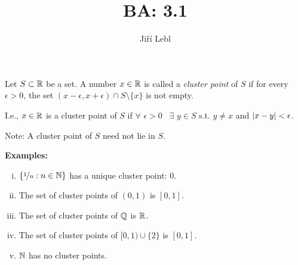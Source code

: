 \documentclass[10pt,aspectratio=169]{beamer}
\author{Ji\v{r}\'i Lebl}
\institute[OSU]{%
Departemento pri Matematiko de Oklahoma {\^S}tata Universitato}
\title{BA: 3.1}
\date{}
\begin{document}
\begin{frame}
\titlepage
\end{frame}

\begin{frame}
\begin{definition}
Let $S \subset {\mathbb{R}}$ be a set.  A number $x \in {\mathbb{R}}$ is called
a \emph{cluster point} of $S$
if for every $\epsilon > 0$, the set $(x-\epsilon,x+\epsilon) \cap S
\setminus \{ x \}$ is not empty.
\end{definition}

\pause

I.e.,
$x \in {\mathbb{R}}$ is a cluster point of $S$ if $\forall$ $\epsilon > 0$ ~$\exists$ $y \in
S$ s.t. $y \not= x$ and $\left\lvert {x - y} \right\rvert < \epsilon$.

\pause
\medskip

Note: A cluster point of $S$ need not lie in $S$.

\pause
\medskip

\textbf{Examples:}
\begin{enumerate}[(i)]
\item
$\{ \nicefrac{1}{n} : n \in {\mathbb{N}} \}$ has a unique cluster point: $0$.
\item\pause The set of cluster points of $(0,1)$ is
$[0,1]$.
\item\pause
The set of cluster points of ${\mathbb{Q}}$ is ${\mathbb{R}}$.
\item\pause
The set of cluster points of $[0,1) \cup \{ 2 \}$ is $[0,1]$.
\item\pause
${\mathbb{N}}$ has no cluster points.
\end{enumerate}

\end{frame}
\end{document}
